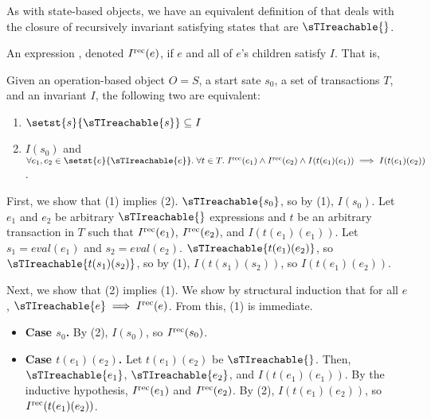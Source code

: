As with state-based objects, we have an equivalent definition of
\sTIconfluence{} that deals with the closure of recursively invariant
satisfying states that are $\sTIreachable{}$.

\begin{definition}
  An expression , denoted $\Irec{e}$, if $e$
  and all of $e$'s children satisfy $I$. That is,
  \begin{mathpar}

  \end{mathpar}
\end{definition}

\begin{claim}
  Given an operation-based object $O = S$, a start sate $s_0$, a set of
  transactions $T$, and an invariant $I$, the following two are equivalent:
  \begin{enumerate}[\quad(1)]
    \item
      $\setst{s}{\sTIreachable{s}} \subseteq I$

    \item
      $I(s_0)$ and
      $\forall e_1, e_2 \in \setst{e}{\sTIreachable{e}}.\;
       \forall t \in T.\;
        \Irec{e_1} \land \Irec{e_2} \land I(t(e_1)(e_1)) \implies
        I(t(e_1)(e_2))$.
  \end{enumerate}
\end{claim}
\begin{elidableproof}
  First, we show that (1) implies (2). $\sTIreachable{s_0}$, so by (1),
  $I(s_0)$. Let $e_1$ and $e_2$ be arbitrary $\sTIreachable{}$ expressions and
  $t$ be an arbitrary transaction in $T$ such that $\Irec{e_1}$, $\Irec{e_2}$,
  and $I(t(e_1)(e_1))$. Let $s_1 = eval(e_1)$ and $s_2 = eval(e_2)$.
  $\sTIreachable{t(e_1)(e_2)}$, so $\sTIreachable{t(s_1)(s_2)}$, so by (1),
  $I(t(s_1)(s_2))$, so $I(t(e_1)(e_2))$.

  Next, we show that (2) implies (1). We show by structural induction that for
  all $e$, $\sTIreachable{e} \implies \Irec{e}$. From this, (1) is immediate.
  \begin{itemize}
    \item \textbf{Case $s_0$.}
      By (2), $I(s_0)$, so $\Irec{s_0}$.

    \item \textbf{Case $t(e_1)(e_2)$.}
      Let $t(e_1)(e_2)$ be $\sTIreachable{}$. Then, $\sTIreachable{e_1}$,
      $\sTIreachable{e_2}$, and $I(t(e_1)(e_1))$. By the inductive hypothesis,
      $\Irec{e_1}$ and $\Irec{e_2}$. By (2), $I(t(e_1)(e_2))$, so
      $\Irec{t(e_1)(e_2)}$.
  \end{itemize}
\end{elidableproof}
